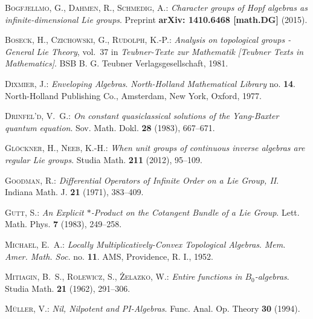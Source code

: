 \documentclass[
11pt,                          %
english                        %
]{article}
\begin{document}
\begin{thebibliography}{1}

\textsc{Bogfjellmo, G., Dahmen, R., Schmedig, A.: }\newblock \emph{Character
  groups of Hopf algebras as infinite-dimensional Lie groups}.
\newblock Preprint  \textbf{arXiv: 1410.6468 [math.DG]} (2015).

\textsc{Boseck, H., Czichowski, G., Rudolph, K.-P.: }\newblock \emph{Analysis
  on topological groups - General Lie Theory}, vol.~37 in \emph{Teubner-Texte
  zur Mathematik [Teubner Texts in Mathematics]}.
\newblock BSB B. G. Teubner Verlagsgesellschaft, 1981.

\textsc{Dixmier, J.: }\newblock \emph{Enveloping Algebras}.
\newblock \emph{North-Holland Mathematical Library} no. \textbf{14}.
\newblock North-Holland Publishing Co., Amsterdam, New York, Oxford, 1977.

\textsc{Drinfel'd, V.~G.: }\newblock \emph{On constant quasiclassical solutions
  of the Yang-Baxter quantum equation}.
\newblock Sov. Math. Dokl.  \textbf{28} (1983), 667--671.

\textsc{Gl{\"o}ckner, H., Neeb, K.-H.: }\newblock \emph{When unit groups of
  continuous inverse algebras are regular Lie groups}.
\newblock Studia Math.  \textbf{211} (2012), 95--109.

\textsc{Goodman, R.: }\newblock \emph{Differential Operators of Infinite Order
  on a Lie Group, II}.
\newblock Indiana Math. J.  \textbf{21} (1971), 383--409.

\textsc{Gutt, S.: }\newblock \emph{An Explicit $*$-Product on the Cotangent
  Bundle of a Lie Group}.
\newblock Lett. Math. Phys.  \textbf{7} (1983), 249--258.

\textsc{Michael, E.~A.: }\newblock \emph{Locally Multiplicatively-Convex
  Topological Algebras}.
\newblock \emph{Mem. Amer. Math. Soc.} no. \textbf{11}.
\newblock AMS, Providence, R. I., 1952.

\textsc{Mitiagin, B.~S., Rolewicz, S., {\.{Z}}elazko, W.: }\newblock
  \emph{Entire functions in $B_0$-algebras}.
\newblock Studia Math.  \textbf{21} (1962), 291--306.

\textsc{M{\"u}ller, V.: }\newblock \emph{Nil, Nilpotent and PI-Algebras}.
\newblock Func. Anal. Op. Theory  \textbf{30} (1994).


\end{thebibliography}
\end{document}
